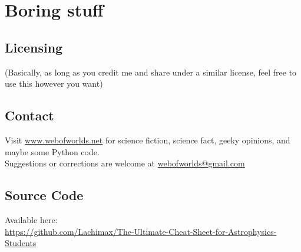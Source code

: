 \chapter{Boring stuff}

\section{Licensing}

\doclicenseThis
    
\noindent(Basically, as long as you credit me and share under a similar license, feel free to use this however you want)

\section{Contact}
\noindent Visit \url{www.webofworlds.net} for science fiction, science fact, geeky opinions, and maybe some Python code. \\ 
Suggestions or corrections are welcome at \url{webofworlds@gmail.com}
\\

\section{Source Code}

Available here:
\\\url{https://github.com/Lachimax/The-Ultimate-Cheat-Sheet-for-Astrophysics-Students}

